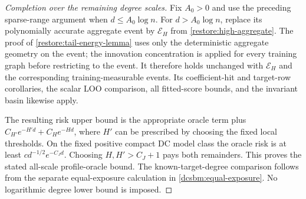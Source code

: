 \begin{proof}[Completion over the remaining degree scales]
Fix $A_0>0$ and use the preceding sparse-range argument when
$d\le A_0\log n$. For $d>A_0\log n$, replace its polynomially
accurate aggregate event by $\mathcal E_H$ from
\cref{restore:high-aggregate}. The proof of
\cref{restore:tail-energy-lemma} uses only the deterministic aggregate
geometry on the event; the innovation concentration is applied for
every training graph before restricting to the event. It therefore
holds unchanged with $\mathcal E_H$ and the corresponding
training-measurable events. Its coefficient-hit and target-row
corollaries, the scalar LOO comparison, all fitted-score bounds,
and the invariant basin likewise apply.

The resulting risk upper bound is the appropriate oracle term plus
$C_{H'}e^{-H'd}+C_He^{-Hd}$, where $H'$ can be prescribed by choosing
the fixed local thresholds. On the fixed positive compact DC model
class the oracle risk is at least $cd^{-1/2}e^{-C_Jd}$.
Choosing $H,H'>C_J+1$ pays both remainders. This proves the stated
all-scale profile-oracle bound. The known-target-degree comparison follows
from the separate equal-exposure calculation in
\cref{dcsbm:equal-exposure}. No logarithmic degree lower bound is imposed.
\end{proof}
